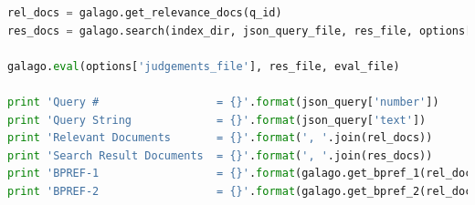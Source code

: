 \documentclass[letterpaper,11pt]{article}
\begin{document}
\begin{lstlisting}[language=python, caption={Code for calculating BPREF values}, label={lst:89}]
rel_docs = galago.get_relevance_docs(q_id)
res_docs = galago.search(index_dir, json_query_file, res_file, options['result_count'])

galago.eval(options['judgements_file'], res_file, eval_file)

print 'Query #                  = {}'.format(json_query['number'])
print 'Query String             = {}'.format(json_query['text'])
print 'Relevant Documents       = {}'.format(', '.join(rel_docs))
print 'Search Result Documents  = {}'.format(', '.join(res_docs))
print 'BPREF-1                  = {}'.format(galago.get_bpref_1(rel_docs, res_docs))
print 'BPREF-2                  = {}'.format(galago.get_bpref_2(rel_docs, res_docs))


\end{lstlisting}

\medskip


\end{document}
